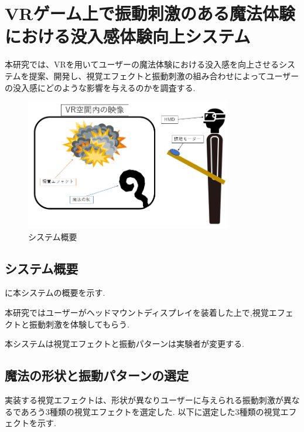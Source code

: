 \chapter{VRゲーム上で振動刺激のある魔法体験における没入感体験向上システム}
本研究では、VRを用いてユーザーの魔法体験における没入感を向上させるシステムを提案、開発し、視覚エフェクトと振動刺激の組み合わせによってユーザーの没入感にどのような影響を与えるのかを調査する.



\begin{figure}[b]
\centering
\includegraphics[clip,width=9cm]{./fig/allsystem.png}
\caption{システム概要}\label{allsystem}
\end{figure}

\section{システム概要}
に本システムの概要を示す.

本研究ではユーザーがヘッドマウントディスプレイを装着した上で,視覚エフェクトと振動刺激を体験してもらう.

本システムは視覚エフェクトと振動パターンは実験者が変更する.





\section{魔法の形状と振動パターンの選定}
実装する視覚エフェクトは、形状が異なりユーザーに与えられる振動刺激が異なるであろう3種類の視覚エフェクトを選定した.
以下に選定した3種類の視覚エフェクトを示す.

